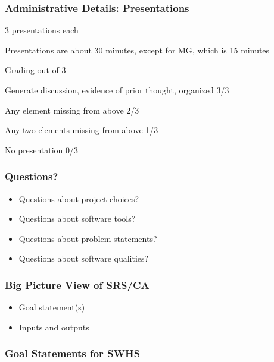 \documentclass[t,12pt,numbers,fleqn]{beamer}
\begin{document}

\begin{frame}
\frametitle{Administrative Details: Presentations}

\bi
\item 3 presentations each
\item Presentations are about 30 minutes, except for MG, which is 15 minutes
\item Grading out of 3
\bi
\item Generate discussion, evidence of prior thought, organized 3/3
\item Any element missing from above 2/3
\item Any two elements missing from above 1/3
\item No presentation 0/3
\ei
\ei

\end{frame}


\begin{frame}
\frametitle{Questions?}
\begin{itemize}
\item Questions about project choices?
\item Questions about software tools?
\item Questions about problem statements?
\item Questions about software qualities?
\end{itemize}
\end{frame}


\begin{frame}
\frametitle{Big Picture View of SRS/CA}

\begin{itemize}
\item Goal statement(s)
\item Inputs and outputs
\end{itemize}

\end{frame}


\begin{frame}
\frametitle{Goal Statements for SWHS}


\end{frame}
\end{document}
